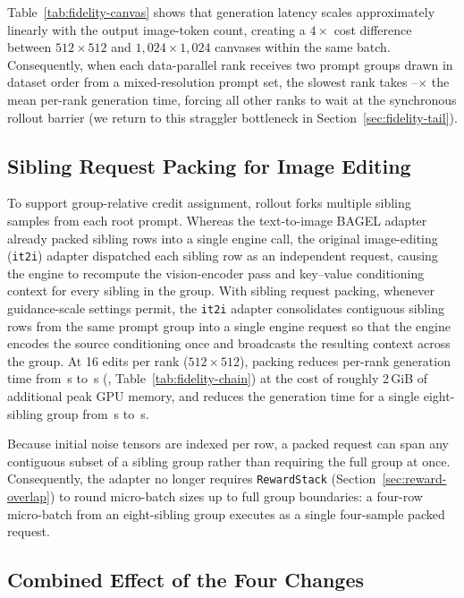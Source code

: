 Table~\ref{tab:fidelity-canvas} shows that generation latency scales approximately linearly with the output image-token count, creating a $4\times$ cost difference between $512\times512$ and $1{,}024\times1{,}024$ canvases within the same batch.
Consequently, when each data-parallel rank receives two prompt groups drawn in dataset order from a mixed-resolution prompt set, the slowest rank takes \RFTailMin{}--\RFTailMax{}$\times$ the mean per-rank generation time, forcing all other ranks to wait at the synchronous rollout barrier (we return to this straggler bottleneck in Section~\ref{sec:fidelity-tail}).

\subsection{Sibling Request Packing for Image Editing}
\label{sec:fidelity-pack}

To support group-relative credit assignment, rollout forks multiple sibling samples from each root prompt.
Whereas the text-to-image BAGEL adapter already packed sibling rows into a single engine call, the original image-editing (\texttt{it2i}) adapter dispatched each sibling row as an independent request, causing the engine to recompute the vision-encoder pass and key--value conditioning context for every sibling in the group.
With sibling request packing, whenever guidance-scale settings permit, the \texttt{it2i} adapter consolidates contiguous sibling rows from the same prompt group into a single engine request so that the engine encodes the source conditioning once and broadcasts the resulting context across the group.
At 16 edits per rank ($512\times512$), packing reduces per-rank generation time from \RFCanvasGenerate{}\,s to \RFPackGenerate{}\,s (\RFPackSaving{}, Table~\ref{tab:fidelity-chain}) at the cost of roughly 2\,GiB of additional peak GPU memory, and reduces the generation time for a single eight-sibling group from \RFUnpackedGroupEight{}\,s to \RFPackedGroupEight{}\,s.

Because initial noise tensors are indexed per row, a packed request can span any contiguous subset of a sibling group rather than requiring the full group at once.
Consequently, the adapter no longer requires \texttt{RewardStack} (Section~\ref{sec:reward-overlap}) to round micro-batch sizes up to full group boundaries: a four-row micro-batch from an eight-sibling group executes as a single four-sample packed request.

\subsection{Combined Effect of the Four Changes}
\label{sec:fidelity-combined}

